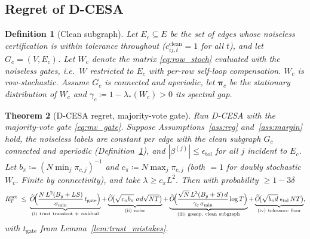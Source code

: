 \documentclass[11pt]{article}
\newtheorem{theorem}{Theorem}[section]
\newtheorem{definition}[theorem]{Definition}
\newcommand{\Ot}{\widetilde{O}}
\begin{document}
\subsection{Regret of D-CESA}

\begin{definition}[Clean subgraph]\label{def:clean}
Let $E_c\subseteq E$ be the set of edges whose noiseless certification
is within tolerance throughout ($c^{\mathrm{clean}}_{ij,t}=1$ for all
$t$), and let $G_c=(V,E_c)$.  Let $W_c$ denote the matrix
\eqref{eq:row_stoch} evaluated with the noiseless gates, i.e.\ $W$
restricted to $E_c$ with per-row self-loop compensation.  $W_c$ is
row-stochastic. Assume $G_c$ is connected and aperiodic, let
$\bm{\pi}_c$ be the stationary distribution of $W_c$ and
$\gamma_c\coloneqq 1-\lambda_*(W_c)>0$ its spectral gap.
\end{definition}

\begin{theorem}[D-CESA regret, majority-vote gate]\label{thm:dcesa}
Run D-CESA with the majority-vote gate \eqref{eq:mv_gate}.  Suppose
Assumptions~\ref{ass:reg} and~\ref{ass:margin} hold, the noiseless
labels are constant per edge with the clean subgraph $G_c$ connected
and aperiodic (Definition~\ref{def:clean}), and
$|\beta^{(j)}|\leq\epsilon_{\mathrm{tol}}$ for all $j$ incident to
$E_c$.  Let $b_\pi\coloneqq(N\min_j\pi_{c,j})^{-1}$ and
$c_\pi\coloneqq N\max_j\pi_{c,j}$ (both $=1$ for doubly stochastic
$W_c$. Finite by connectivity), and take
$\lambda\geq c_\pi L^2$.  Then with probability $\geq 1-3\delta$
\begin{equation}
R_T^{\mathrm{net}}\;\leq\;
\underbrace{\Ot\!\Bigl(\frac{N\,L^2(B_y+LS)}{\sigma_{\min}}\,
t_{\mathrm{gate}}\Bigr)}_{\mathrm{(i)\ trust\ transient\ +\ residual}}
+\underbrace{\Ot\!\bigl(\sqrt{c_\pi b_\pi}\;\sigma d\sqrt{NT}\bigr)}_{\mathrm{(ii)\ noise}}
+\underbrace{\Ot\!\Bigl(\frac{\sqrt N\,L^3(B_y+S)\,d}{\gamma_c\,\sigma_{\min}}\log T\Bigr)}_{\mathrm{(iii)\ gossip,\ clean\ subgraph}}
+\underbrace{\Ot\!\bigl(\sqrt{b_\pi d}\;\epsilon_{\mathrm{tol}}\,NT\bigr)}_{\mathrm{(iv)\ tolerance\ floor}},
\label{eq:dcesa}
\end{equation}
with $t_{\mathrm{gate}}$ from Lemma~\ref{lem:trust_mistakes}.
\end{theorem}
\end{document}
